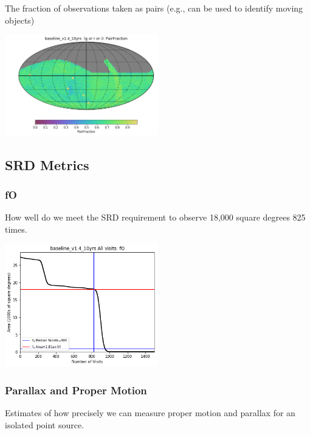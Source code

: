 The fraction of observations taken as pairs (e.g., can be used to identify moving objects)

\includegraphics[width=0.5\textwidth]{metric_summary/glance/thumb.baseline_v1_4_10yrs_PairFraction_g_or_r_or_i_HEAL_SkyMap.png}

\subsection{SRD Metrics}

\subsubsection{fO}

How well do we meet the SRD requirement to observe 18,000 square degrees 825 times.

\includegraphics[width=0.5\textwidth]{metric_summary/glance/thumb.baseline_v1_4_10yrs_fO_All_visits_HEAL_FO.png}


\subsubsection{Parallax and Proper Motion}

Estimates of how precisely we can measure proper motion and parallax for an isolated point source.

